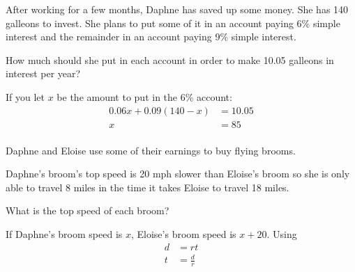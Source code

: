 \documentclass[letterpaper]{exam}
\begin{document}
\begin{questions}

    \question[15]
    After working for a few months, Daphne has saved up some money. She has 140 galleons to
    invest. She plans to put some of it in an account paying 6\% simple interest and the remainder
    in an account paying 9\% simple interest. 
    
    How much should she put in each account in order to make 10.05 galleons in interest per year?

    \begin{solution}
      If you let $x$ be the amount to put in the 6\% account:
      \begin{align*}
        0.06x + 0.09( 140 - x ) & = 10.05 \\
        x                       & = 85 \\
      \end{align*}
    \end{solution}





    \bonusquestion[15] 
      Daphne and Eloise use some of their earnings to buy flying brooms. 
      
      Daphne's broom's top speed is 20 mph slower than Eloise's broom so she is only able to travel
      8 miles in the time it takes Eloise to travel 18 miles. 
      
      What is the top speed of each broom?

      \begin{solution}
        If Daphne's broom speed is $x$, Eloise's broom speed is $x + 20$. Using 
        \begin{align*}
          d & = rt \\
          t & = \frac{d}{r} \\
        \end{align*}


\end{solution}
\end{questions}
\end{document}
